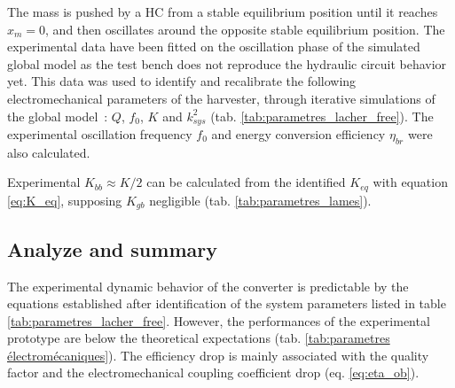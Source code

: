 \documentclass[3p,twocolumn,preprint]{elsarticle}
\begin{document}
The mass is pushed by a HC from a stable equilibrium position until it reaches \mbox{$x_m=0$}, and then oscillates around the opposite stable equilibrium position. The experimental data have been fitted on the oscillation phase of the simulated global model as the test bench does not reproduce the hydraulic circuit behavior yet. This data was used to identify and recalibrate the following electromechanical parameters of the harvester, through iterative simulations of the global \mbox{model :} $Q$, $f_0$, $K$ and $k_{sys}^2$ (tab. \ref{tab:parametres_lacher_free}).  The experimental oscillation frequency $f_0$ and energy conversion efficiency $\eta_{br}$ were also calculated.
\begin{table}[!htbp]
\centering
\captionsetup{justification=centering}
	\caption{Theoretical and experimentally recalibrated values of the electromechanical converter.}
	\label{tab:parametres_lacher_free}
\end{table} 

Experimental $K_{bb}\approx K/2$ can be calculated from the identified $K_{eq}$ with equation \ref{eq:K_eq}, supposing $K_{gb}$ negligible (tab. \ref{tab:parametres_lames}).
	\subsection{Analyze and summary}	
	\label{subsec:Analyze and summary}
The experimental dynamic behavior of the converter is predictable by the equations established after identification of the system parameters listed in table \ref{tab:parametres_lacher_free}. However, the performances of the experimental prototype are below the theoretical expectations (tab. \ref{tab:parametres électromécaniques}). The efficiency drop is mainly associated with the quality factor and the electromechanical coupling coefficient drop (eq. \ref{eq:eta_ob}). 
\end{document}
